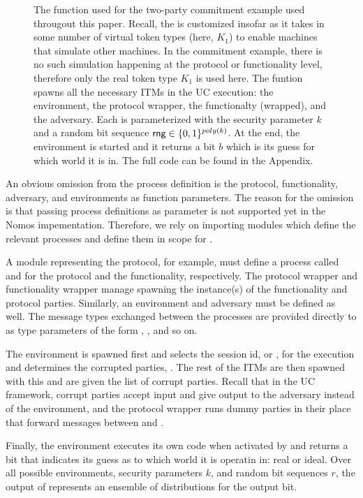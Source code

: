 \begin{figure*}

\caption{The  function used for the two-party commitment example used througout this paper. Recall, the  is customized insofar as it takes in some number of virtual token types (here, $K_1$) to enable machines that simulate other machines. In the commitment example, there is no such simulation happening at the protocol or functionality level, therefore only the real token type $K_1$ is used here. The funtion spawns all the necessary ITMs in the UC execution: the environment, the protocol wrapper, the functionalty (wrapped), and the adversary. Each is parameterized with the security parameter $k$ and a random bit sequence ${\mathsf {rng}} \in \{0,1\}^{poly(k)}$.
At the end, the environment is started and it returns a bit $b$ which is its guess for which world it is in. The full code can be found in the Appendix.}
\label{lst:execuc}
\end{figure*}

An obvious omission from the  process definition is the protocol, functionality, adversary, and environments as function parameters.
The reason for the omission is that passing process definitions as parameter is not supported yet in the Nomos impementation.
Therefore, we rely on importing modules which define the relevant processes and define them in scope for .

A module representing the protocol, for example,  must define a process called  and  for the protocol and the functionality, respectively.
The protocol wrapper and functionality wrapper manage spawning the instance(s) of the functionality and protocol parties.
Similarly, an environment  and adversary  must be defined as well.
The message types exchanged between the processes are provided directly to  as type parameters of the form , , and so on. 

The environment is spawned first and selects the session id, or , for the execution and determines the corrupted parties, .
The rest of the ITMs are then spawned with this  and are given the list of corrupt parties.
Recall that in the UC framework, corrupt parties accept input and give output to the adversary instead of the environment, and the protocol wrapper runs dummy parties in their place that forward messages between \Adversary and \F.

Finally, the environment executes its own code when activated by  and returns a bit that indicates its guess as to which world it is operatin in: real or ideal.
Over all possible environments, security parameters $k$, and random bit sequences $r$, the output of  represents an ensemble of distributions for the output bit. 

